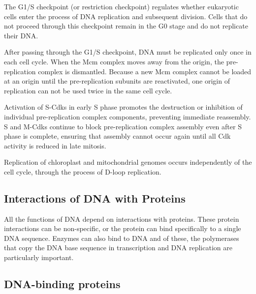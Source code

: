 The G1/S checkpoint (or restriction checkpoint) regulates whether eukaryotic cells enter the process of DNA replication and subsequent division. Cells that do not proceed through this checkpoint remain in the G0 stage and do not replicate their DNA.

After passing through the G1/S checkpoint, DNA must be replicated only once in each cell cycle. When the Mcm complex moves away from the origin, the pre-replication complex is dismantled. Because a new Mcm complex cannot be loaded at an origin until the pre-replication subunits are reactivated, one origin of replication can not be used twice in the same cell cycle.

Activation of S-Cdks in early S phase promotes the destruction or inhibition of individual pre-replication complex components, preventing immediate reassembly. S and M-Cdks continue to block pre-replication complex assembly even after S phase is complete, ensuring that assembly cannot occur again until all Cdk activity is reduced in late mitosis.

Replication of chloroplast and mitochondrial genomes occurs independently of the cell cycle, through the process of D-loop replication.

\hypertarget{interactions-of-dna-with-proteins}{%
\subsection{Interactions of DNA with Proteins}\label{interactions-of-dna-with-proteins}}

All the functions of DNA depend on interactions with proteins. These protein interactions can be non-specific, or the protein can bind specifically to a single DNA sequence. Enzymes can also bind to DNA and of these, the polymerases that copy the DNA base sequence in transcription and DNA replication are particularly important.

\hypertarget{dna-binding-proteins}{%
\subsection{DNA-binding proteins}\label{dna-binding-proteins}}

